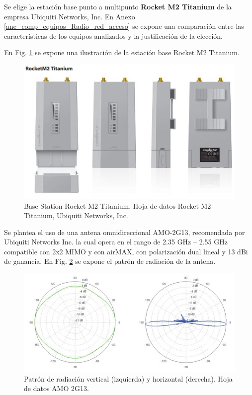 \documentclass[12pt,a4paper]{book}
\begin{document}
\medskip

Se elige la estación base punto a multipunto \textbf{Rocket M2 Titanium} de la empresa Ubiquiti Networks, Inc. En Anexo \ref{ane_comp_equipos_Radio_red_acceso} se expone una comparación entre las características de los equipos analizados y la justificación de la elección.
\medskip 

En Fig. \ref{Fig_Rocket_M2_T} se expone una ilustración de la estación base Rocket M2 Titanium.

\medskip

\begin{figure} [H]
\centering
\includegraphics[width= 15cm]{../figuras/Rocket_M2_Titanium.JPG}

\caption{Base Station Rocket M2 Titanium. Hoja de datos Rocket M2 Titanium, Ubiquiti Networks, Inc. }
\label{Fig_Rocket_M2_T}
\end{figure}


\medskip

Se plantea el uso de una antena omnidireccional AMO-2G13, recomendada por Ubiquiti Networks Inc. la cual opera en el rango de 2.35 GHz – 2.55 GHz compatible con 2x2 MIMO y con airMAX, con polarización dual lineal y 13 dBi de ganancia. En Fig. \ref{Fig_patron_rad_antena} se expone el patrón de radiación de la antena. \medskip

\begin{figure} [H]
\centering
\includegraphics[width= 010 cm]{../figuras/patron_radiacion_amo_2g13.JPG}

\caption{Patrón de radiación vertical (izquierda) y horizontal (derecha). Hoja de datos AMO 2G13.}
\label{Fig_patron_rad_antena}
\end{figure}
\end{document}
